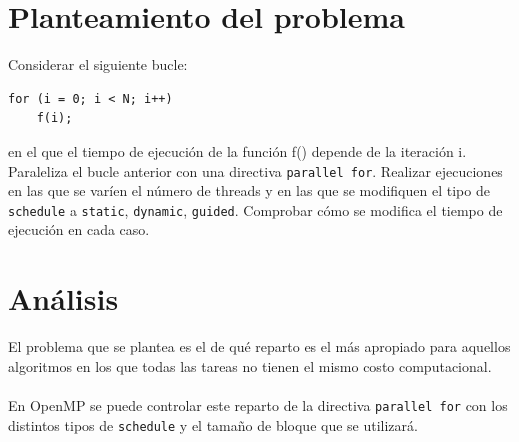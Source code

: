 \author{\myName} %

\date{\myTime} %


	
\setcounter{page}{0}

\maketitle %
\thispagestyle{empty}

\newpage %

\tableofcontents %

\newpage


\section{Planteamiento del problema}

Considerar el siguiente bucle: 
\begin{lstlisting}[style=pseudo]
for (i = 0; i < N; i++)
	f(i);
\end{lstlisting}
en el que el tiempo de ejecución de la función f() depende de la iteración i. Paraleliza el bucle anterior con una directiva \texttt{parallel for}. Realizar ejecuciones en las que se varíen el número de threads y en las que se modifiquen el tipo de \texttt{schedule} a \texttt{static}, \texttt{dynamic}, \texttt{guided}. Comprobar cómo se modifica el tiempo de ejecución en cada caso.

\section{Análisis}

El problema que se plantea es el de qué reparto es el más apropiado para aquellos algoritmos en los que todas las tareas no tienen el mismo costo computacional.
\\ \\
En OpenMP se puede controlar este reparto de la directiva \texttt{parallel for} con los distintos tipos de \texttt{schedule} y el tamaño de bloque que se utilizará.

